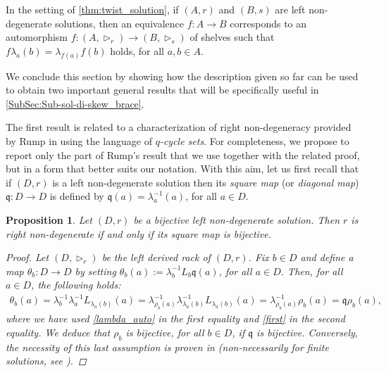 \documentclass[preprint,1p]{elsarticle}
\numberwithin{equation}{section}
\newtheorem{prop}[theor]{Proposition}
\theoremstyle{definition}               %
\newcommand{\tr}{\triangleright}
\begin{document}
In the setting of \cref{thm:twist_solution}, if $(A,r)$ and $(B,s)$ are left non-degenerate solutions, then an equivalence $f:A\to B$ corresponds to an automorphism $f:(A,\tr_r) \to (B,\tr_s)$ of shelves such that $f\lambda_a(b) = \lambda_{f(a)}f(b)$ holds, for all $a,b\in A$.

\medskip

We conclude this section by showing how the description given so far can be used to obtain two important general results that will be specifically useful in \cref{SubSec:Sub-sol-di-skew_brace}.
\smallskip

The first result is related to a characterization of right non-degeneracy provided by Rump in \cite[Corollary~2, p.~21]{Ru19}  using the language of \emph{$q$-cycle sets}. For completeness, we propose to report only the part of Rump's result that we use together with the related proof, but in a form that better suits our notation.
With this aim, let us first recall that if $(D,r)$ is a left non-degenerate solution then its \emph{square map} (or \emph{diagonal map}) $\mathfrak{q}:D \to D$ is defined by $\mathfrak{q}(a) = \lambda^{-1}_a(a)$, for all $a \in D$.

\begin{prop}\label{lem:rho_nondegenerate_sol}\label{prop:bijleft-right}
    Let $(D,r)$ be a bijective left non-degenerate solution.
    Then $r$ is right non-degenerate if and only if its {square map} is bijective.
    \begin{proof}
        {Let $(D,\tr_r)$ be the left derived rack of $(D,r)$.}
        Fix $b \in D$ and define a map $\theta_b:D\to D$ by setting $\theta_b(a):= \lambda_b^{-1}L_b\mathfrak{q}\left(a\right)$, for all $a\in D$. Then, for all $a \in D$, the following holds: 
        \begin{align*}
            \theta_b\left(a\right)
            =  \lambda^{-1}_b\lambda^{-1}_a L_{\lambda_a\left(b\right)}\left(a\right)
            = \lambda^{-1}_{\rho_b\left(a\right)}\lambda^{-1}_{\lambda_a\left(b\right)}L_{\lambda_a\left(b\right)}\left(a\right) 
            = \lambda^{-1}_{\rho_b\left(a\right)}\rho_b\left(a\right) 
            =  \mathfrak{q}\rho_b\left(a\right),
        \end{align*}
        where we have used {\eqref{lambda_auto} in the first equality and} \eqref{first} in the second equality.
        We deduce that $\rho_b$ is bijective, for all $b\in D$, if $\mathfrak{q}$ is bijective.
        Conversely, the necessity of this last assumption is proven in \cite[Lemma 3.1]{LeVe19} (non-necessarily for finite solutions, see \cite[Remark 3.10]{LeVe19}).
    \end{proof}
\end{prop}
\end{document}

